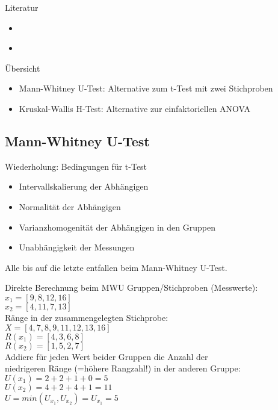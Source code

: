 \begin{frame}
  {Literatur}
  \begin{itemize}
    \item \cite{BortzLienert2008}
    \item \cite{GravetterWallnau2007}
  \end{itemize}
\end{frame}

\begin{frame}
  {Übersicht}
  \begin{itemize}[<+->]
    \item Mann-Whitney U-Test: Alternative zum t-Test mit zwei Stichproben
    \item Kruskal-Wallis H-Test: Alternative zur einfaktoriellen ANOVA
  \end{itemize}
\end{frame}

\subsection{Mann-Whitney U-Test}

\begin{frame}
  {Wiederholung: Bedingungen für t-Test}
  \begin{itemize}[<+->]
    \item Intervallskalierung der Abhängigen
    \item Normalität der Abhängigen
    \item Varianzhomogenität der Abhängigen in den Gruppen
    \item Unabhängigkeit der Messungen
      \Zeile
  \end{itemize}
  \pause
  \begin{center}
    Alle bis auf die letzte entfallen beim Mann-Whitney U-Test.
  \end{center}
\end{frame}

\begin{frame}
  {Direkte Berechnung beim MWU}
  Gruppen\slash Stichproben (Messwerte):\\
  $x_1=[9,8,12,16]$\\
  $x_2=[4,11,7,13]$\\[2ex]
  \pause
  Ränge in der \alert{zusammengelegten} Stichprobe:\\
  $X=[4,7,8,9,11,12,13,16]$\\
  $R(x_1)=[4,3,6,8]$\\
  $R(x_2)=[1,5,2,7]$\\[2ex]
  \pause
  Addiere für jeden Wert beider Gruppen die Anzahl der\\
  \alert{niedrigeren Ränge (=höhere Rangzahl!)} in der anderen Gruppe:\\
  $U(x_1)=2+2+1+0=5$\\
  $U(x_2)=4+2+4+1=11$\\
  \alert{$U=min(U_{x_1}, U_{x_2})=U_{x_1}=5$}
\end{frame}

